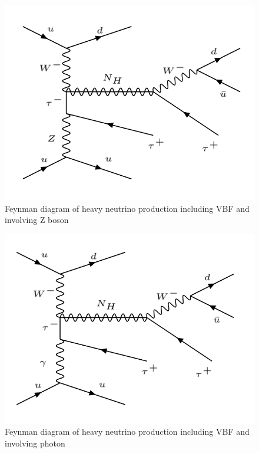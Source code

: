 \begin{figure}[H]
\centering
\includegraphics[scale = 0.45]{Figures/Feynman_hnZ}
\caption{Feynman diagram of heavy neutrino production including VBF and involving Z boson}
\label{fig: hnZ}
\end{figure}

\begin{figure}[H]
\centering
\includegraphics[scale = 0.45]{Figures/Feynman_hnGamma}
\caption{Feynman diagram of heavy neutrino production including VBF and involving photon}
\label{fig: hnGamma}
\end{figure}

